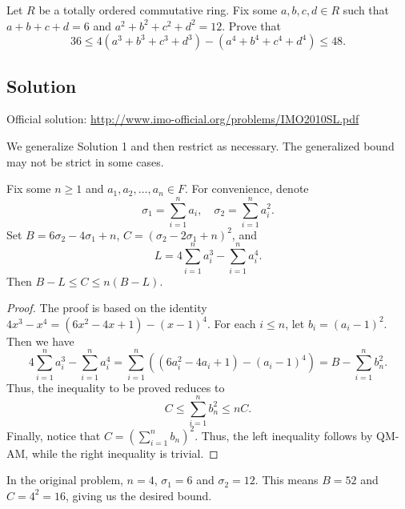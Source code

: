 Let $R$ be a totally ordered commutative ring.
Fix some $a, b, c, d \in R$ such that $a + b + c + d = 6$ and $a^2 + b^2 + c^2 + d^2 = 12$.
Prove that
\[ 36 \leq 4(a^3 + b^3 + c^3 + d^3) - (a^4 + b^4 + c^4 + d^4) \leq 48. \]



\subsection*{Solution}

Official solution: \url{http://www.imo-official.org/problems/IMO2010SL.pdf}

We generalize Solution 1 and then restrict as necessary.
The generalized bound may not be strict in some cases.

\begin{claim}
Fix some $n \geq 1$ and $a_1, a_2, \ldots, a_n \in F$.
For convenience, denote
\[ \sigma_1 = \displaystyle \sum_{i = 1}^n a_i, \quad \sigma_2 = \displaystyle \sum_{i = 1}^n a_i^2. \]
Set $B = 6 \sigma_2 - 4 \sigma_1 + n$, $C = (\sigma_2 - 2 \sigma_1 + n)^2$, and
\[ L = 4 \sum_{i = 1}^n a_i^3 - \sum_{i = 1}^n a_i^4. \]
Then $B - L \leq C \leq n(B - L)$.
\end{claim}
\begin{proof}
The proof is based on the identity $4x^3 - x^4 = (6x^2 - 4x + 1) - (x - 1)^4$.
For each $i \leq n$, let $b_i = (a_i - 1)^2$.
Then we have
\[ 4 \sum_{i = 1}^n a_i^3 - \sum_{i = 1}^n a_i^4 = \sum_{i = 1}^n ((6 a_i^2 - 4 a_i + 1) - (a_i - 1)^4) = B - \sum_{i = 1}^n b_n^2. \]
Thus, the inequality to be proved reduces to
\[ C\leq \sum_{i = 1}^n b_n^2 \leq nC. \]
Finally, notice that $C = \displaystyle \left(\sum_{i = 1}^n b_n\right)^2$.
Thus, the left inequality follows by QM-AM, while the right inequality is trivial.
\end{proof}

In the original problem, $n = 4$, $\sigma_1 = 6$ and $\sigma_2 = 12$.
This means $B = 52$ and $C = 4^2 = 16$, giving us the desired bound.
